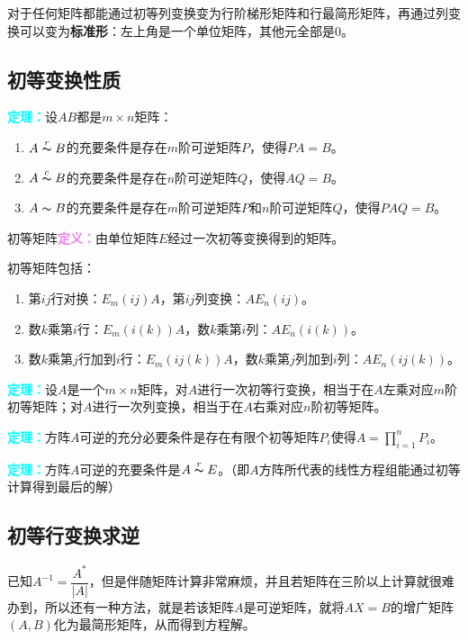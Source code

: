 \documentclass[UTF8, 12pt]{ctexart}
\begin{document}
对于任何矩阵都能通过初等列变换变为行阶梯形矩阵和行最简形矩阵，再通过列变换可以变为\textbf{标准形}：左上角是一个单位矩阵，其他元全部是0。

\subsection{初等变换性质}

\textcolor{aqua}{\textbf{定理：}}设$AB$都是$m\times n$矩阵：\begin{enumerate}
    \item $A\overset{r}{\thicksim}B$的充要条件是存在$m$阶可逆矩阵$P$，使得$PA=B$。
    \item $A\overset{c}{\thicksim}B$的充要条件是存在$n$阶可逆矩阵$Q$，使得$AQ=B$。
    \item $A\thicksim B$的充要条件是存在$m$阶可逆矩阵$P$和$n$阶可逆矩阵$Q$，使得$PAQ=B$。
\end{enumerate}

初等矩阵\textcolor{violet}{\textbf{定义：}}由单位矩阵$E$经过一次初等变换得到的矩阵。

初等矩阵包括：\begin{enumerate}
    \item 第$ij$行对换：$E_m(ij)A$，第$ij$列变换：$AE_n(ij)$。
    \item 数$k$乘第$i$行：$E_m(i(k))A$，数$k$乘第$i$列：$AE_n(i(k))$。
    \item 数$k$乘第$j$行加到$i$行：$E_m(ij(k))A$，数$k$乘第$j$列加到$i$列：$AE_n(ij(k))$。
\end{enumerate}

\textcolor{aqua}{\textbf{定理：}}设$A$是一个$m\times n$矩阵，对$A$进行一次初等行变换，相当于在$A$左乘对应$m$阶初等矩阵；对$A$进行一次列变换，相当于在$A$右乘对应$n$阶初等矩阵。

\textcolor{aqua}{\textbf{定理：}}方阵$A$可逆的充分必要条件是存在有限个初等矩阵$P_i$使得$A=\prod\limits_{i=1}^nP_i$。

\textcolor{aqua}{\textbf{定理：}}方阵$A$可逆的充要条件是$A\overset{r}{\thicksim}E$。（即$A$方阵所代表的线性方程组能通过初等计算得到最后的解）

\subsection{初等行变换求逆}

已知$A^{-1}=\dfrac{A^*}{\vert A\vert}$，但是伴随矩阵计算非常麻烦，并且若矩阵在三阶以上计算就很难办到，所以还有一种方法，就是若该矩阵$A$是可逆矩阵，就将$AX=B$的增广矩阵$(A,B)$化为最简形矩阵，从而得到方程解。
\end{document}
